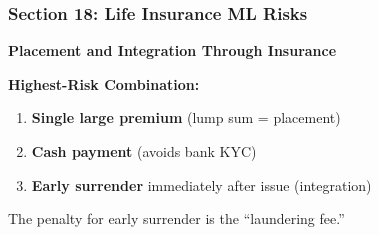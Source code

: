 \documentclass[12pt,aspectratio=169]{beamer}
\begin{document}
	\begin{frame}
		\frametitle{\fontsize{13}{15}\selectfont \textbf{Section 18: Life Insurance ML Risks}}
		\vspace{0.3cm}
		\begin{center}
			{\fontsize{12}{14}\selectfont \textbf{Placement and Integration Through Insurance}}
		\end{center}
		\vspace{0.2cm}
		\begin{block}{}
			\centering
			\textbf{Highest-Risk Combination:}
			\vspace{0.1cm}
			\begin{enumerate}
				\item \textbf{Single large premium} (lump sum = placement)
				\item \textbf{Cash payment} (avoids bank KYC)
				\item \textbf{Early surrender} immediately after issue (integration)
			\end{enumerate}
			\vspace{0.1cm}
			The penalty for early surrender is the ``laundering fee.''
		\end{block}
	\end{frame}
	
\end{document}
